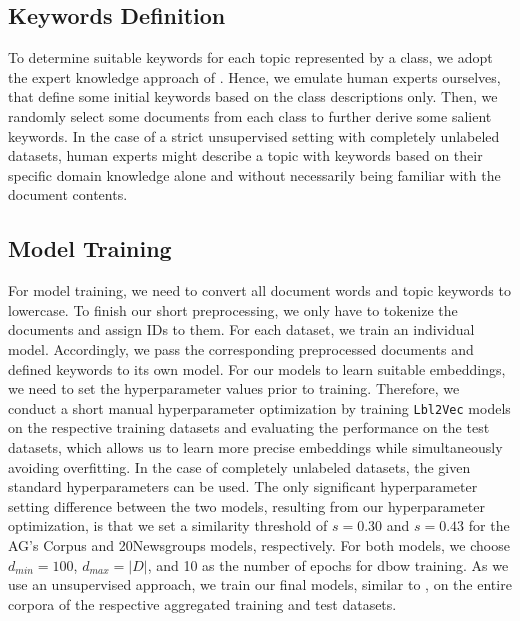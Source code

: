 \documentclass[a4paper,twoside]{article}
\begin{document}
\subsection{Keywords Definition}
To determine suitable keywords for each topic represented by a class, we adopt the expert knowledge approach of \citet{haj-yahia-etal-2019-towards}. Hence, we emulate human experts ourselves, that define some initial keywords based on the class descriptions only. Then, we randomly select some documents from each class to further derive some salient keywords. In the case of a strict unsupervised setting with completely unlabeled datasets, human experts might describe a topic with keywords based on their specific domain knowledge alone and without necessarily being familiar with the document contents. 

\subsection{Model Training}
For model training, we need to convert all document words and topic keywords to lowercase. To finish our short preprocessing, we only have to tokenize the documents and assign IDs to them. For each dataset, we train an individual model. Accordingly, we pass the corresponding preprocessed documents and defined keywords to its own model. For our models to learn suitable embeddings, we need to set the hyperparameter values prior to training. Therefore, we conduct a short manual hyperparameter optimization by training \texttt{Lbl2Vec} models on the respective training datasets and evaluating the performance on the test datasets, which allows us to learn more precise embeddings while simultaneously avoiding overfitting. In the case of completely unlabeled datasets, the given standard hyperparameters can be used. The only significant hyperparameter setting difference between the two models, resulting from our hyperparameter optimization, is that we set a similarity threshold of ${s=0.30}$ and ${s=0.43}$ for the AG's Corpus and 20Newsgroups models, respectively. For both models, we choose ${d_{min}=100}$, ${d_{max}=|D|}$, and 10 as the number of epochs for \ac{dbow} training. As we use an unsupervised approach, we train our final models, similar to \citet{haj-yahia-etal-2019-towards}, on the entire corpora of the respective aggregated training and test datasets.
\end{document}
